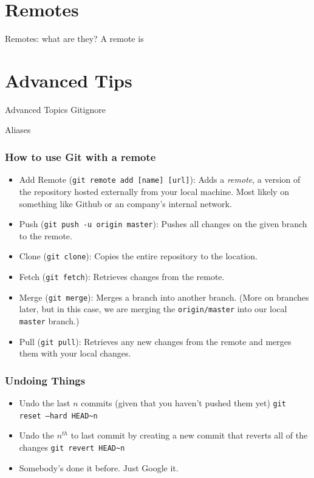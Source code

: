 \documentclass{beeper}
\begin{document}
\section{Remotes}

\begin{frame}{Remotes: what are they?}
    A remote is 
\end{frame}

\section{Advanced Tips}

\begin{frame}{Advanced Topics}
    Gitignore

    Aliases
\end{frame}

\begin{frame}
    \frametitle{How to use Git with a remote}

    \begin{itemize}
        \item Add Remote (\texttt{git remote add [name] [url]}): Adds a
            \textit{remote}, a version of the repository hosted externally from
            your local machine. Most likely on something like Github or an
            company's internal network.
        \item Push (\texttt{git push -u origin master}): Pushes all changes on
            the given branch to the remote.
        \item Clone (\texttt{git clone}): Copies the entire repository to the
            location.
        \item Fetch (\texttt{git fetch}): Retrieves changes from the remote.
        \item Merge (\texttt{git merge}): Merges a branch into another branch.
            (More on branches later, but in this case, we are merging the
            \texttt{origin/master} into our local \texttt{master} branch.)
        \item Pull (\texttt{git pull}): Retrieves any new changes from the
            remote and merges them with your local changes.
    \end{itemize}
\end{frame}

\begin{frame}
    \frametitle{Undoing Things}

    \begin{itemize}
        \item Undo the last $n$ commits (given that you haven't pushed them yet)
            \texttt{git reset --hard HEAD\textasciitilde n}
        \item Undo the $n^{th}$ to last commit by creating a new commit that
            reverts all of the changes \texttt{git revert HEAD\textasciitilde n}
        \item Somebody's done it before. Just Google it.
    \end{itemize}
\end{frame}
\end{document}
